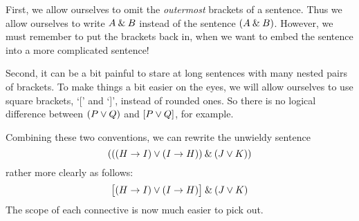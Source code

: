 First,  we allow ourselves to omit the \emph{outermost} brackets of a sentence. Thus we allow ourselves to write $A\mathbin{\&} B$ instead of the sentence $(A\mathbin{\&} B)$. However, we must remember to put the brackets back in, when we want to embed the sentence into a more complicated sentence!

Second, it can be a bit painful to stare at long sentences with many nested pairs of brackets. To make things a bit easier on the eyes, we will  allow ourselves to use square brackets, `[' and `]', instead of rounded ones. So there is no logical difference between $(P\vee Q)$ and $[P\vee Q]$, for example.

Combining these two conventions, we can rewrite the unwieldy sentence
$$(((H \rightarrow I) \vee (I \rightarrow H)) \mathbin{\&} (J \vee K))$$
rather more clearly as follows:
$$\bigl[(H \rightarrow I) \vee (I \rightarrow H)\bigr] \mathbin{\&} (J \vee K)$$
The scope of each connective is now much easier to pick out.

